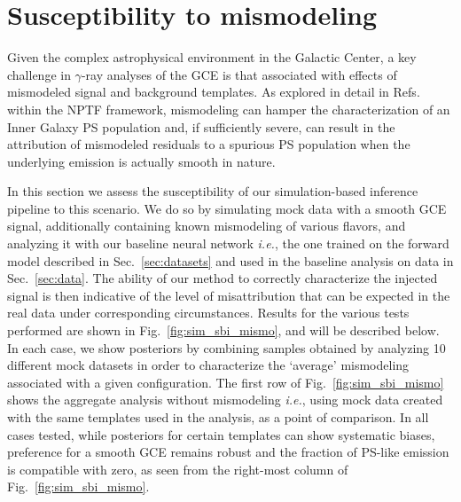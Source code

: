 \documentclass[prd,aps,10pt,nofootinbib,twocolumn,superscriptaddress,preprintnumbers,balancelastpage,longbibliography]{revtex4-1}
\begin{document}

\section{Susceptibility to mismodeling}
\label{sec:mismodeling}

Given the complex astrophysical environment in the Galactic Center, a key challenge in $\gamma$-ray analyses of the GCE is that associated with effects of mismodeled signal and background templates. As explored in detail in Refs.~\cite{Lee:2015fea,Leane:2020pfc,Leane:2020nmi,Buschmann:2020adf,Chang:2019ars} within the NPTF framework, mismodeling can hamper the characterization of an Inner Galaxy PS population and, if sufficiently severe, can result in the attribution of mismodeled residuals to a spurious PS population when the underlying emission is actually smooth in nature. 

In this section we assess the susceptibility of our simulation-based inference pipeline to this scenario. We do so by simulating mock data with a smooth GCE signal, additionally containing known mismodeling of various flavors, and analyzing it with our baseline neural network \emph{i.e.}, the one trained on the forward model described in Sec.~\ref{sec:datasets} and used in the baseline analysis on data in Sec.~\ref{sec:data}. The ability of our method to correctly characterize the injected signal is then indicative of the level of misattribution that can be expected in the real data under corresponding circumstances. Results for the various tests performed are shown in Fig.~\ref{fig:sim_sbi_mismo}, and will be described below. In each case, we show posteriors by combining samples obtained by analyzing 10 different mock datasets in order to characterize the `average' mismodeling associated with a given configuration. The first row of Fig.~\ref{fig:sim_sbi_mismo} shows the aggregate analysis without mismodeling \emph{i.e.}, using mock data created with the same templates used in the analysis, as a point of comparison. In all cases tested, while posteriors for certain templates can show systematic biases, preference for a smooth GCE remains robust and the fraction of PS-like emission is compatible with zero, as seen from the right-most column of Fig.~\ref{fig:sim_sbi_mismo}. \\
\end{document}
